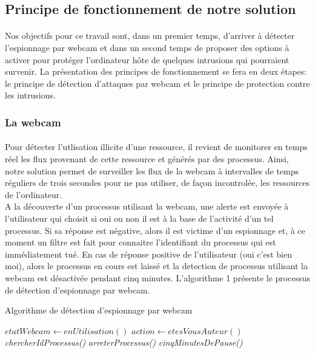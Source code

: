   \subsection{Principe de fonctionnement de notre solution}
      \paragraph{}
	  Nos objectifs pour ce travail sont, dans un premier temps, d'arriver à détecter l'espionnage par webcam et dans un second temps de proposer des options à activer pour protéger l'ordinateur hôte de quelques intrusions qui pourraient survenir. La présentation des principes de fonctionnement se fera en deux étapes: le principe de détection d'attaques par webcam et le principe de protection contre les intrusions.
	  
	  \subsubsection{La webcam}
	  \paragraph{}
	  	Pour détecter l'utlisation illicite d'une ressource, il revient de monitorer en temps réel les flux provenant de cette ressource et générés par des processus. Ainsi, notre solution permet de surveiller les flux de la webcam à intervalles de temps réguliers de trois secondes pour ne pas utiliser, de façon incontrolée, les ressources de l'ordinateur. \\ 
	  	A la découverte d'un processus utilisant la webcam, une alerte est envoyée à l'utilisateur qui choisit si oui ou non il est à la base de l'activité d'un tel processus. Si sa réponse est négative, alors il est victime d'un espionnage et, à ce moment un filtre est fait pour connaitre l'identifiant du processus qui est immédiatement tué. En cas de réponse positive de l'utilisateur (oui c'est bien moi), alors le processus en cours est laissé et la detection de processus utilisant la webcam est désactivée pendant cinq minutes. L'algorithme 1 présente le processus de détection d'espionnage par webcam.
					
						\begin{algorithm}[H]
						\caption{Algorithme de détection d'espionnage par webcam}
\DontPrintSemicolon %

 {
$etatWebcam \gets enUtilisation()$\;
   {
    $action \gets etesVousAuteur()$\;
      {
    	\textit{chercherIdProcessus()}\;
    	\textit{arreterProcessus()}\;
  }{
	\textit{cinqMinutesDePause()}\;  
  }
  }
}
\;
\label{algo:webcam}
\end{algorithm}  		
	  	 
